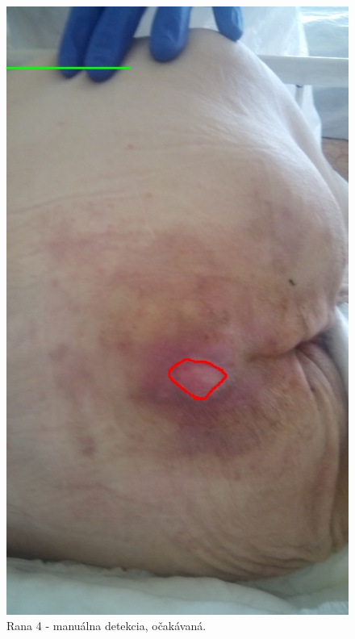 \begin{figure}[h]
   \begin{minipage}{0.48\textwidth}
     \centering
     \includegraphics[scale=0.35]{fig/4m.jpeg}
      \caption{Rana 4 - manuálna detekcia, očakávaná.}
      \label{fig:w4}
   \end{minipage}\hfill
   \begin{minipage}{0.48\textwidth}
     \centering

\end{minipage}
\end{figure}
